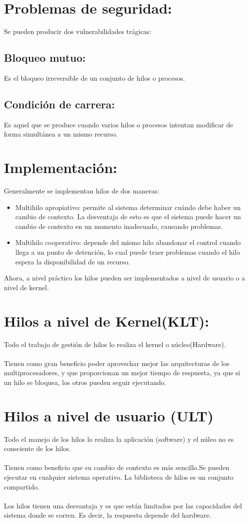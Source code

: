 \documentclass{report}   %
\begin{document}
\section*{Problemas de seguridad:}
Se pueden producir dos vulnerabilidades trágicas:
\subsection*{Bloqueo mutuo: }
 Es el bloqueo irreversible de un conjunto de hilos o procesos.
 \subsection*{Condición de carrera:}
  Es aquel que se produce cuando varios hilos o procesos intentan modificar de forma simultánea a un mismo recurso.\\
  
  \section*{Implementación:}
 Generalmente se implementan hilos de dos maneras:
\begin{itemize}
    \item Multihilo apropiativo: permite al sistema determinar cuándo debe haber un cambio de contexto. La desventaja de esto es que el sistema puede hacer un cambio de contexto en un momento inadecuado, causando problemas.
    \item Multihilo cooperativo: depende del mismo hilo abandonar el control cuando llega a un punto de detención, lo cual puede traer problemas cuando el hilo espera la disponibilidad de un recurso.
\end{itemize}

Ahora, a nivel práctico los hilos pueden ser implementados a nivel de usuario o a nivel de kernel. 

\section*{Hilos a nivel de Kernel(KLT):}
Todo el trabajo de gestión de hilos lo realiza el kernel o núcleo(Hardware).\\\\
Tienen como gran beneficio poder aprovechar mejor las arquitecturas de los
multiprocesadores, y que proporcionan un mejor tiempo de respuesta, ya que si un hilo se bloquea, los otros pueden seguir ejecutando.
\section*{Hilos a nivel de usuario (ULT)}
 Todo el manejo de los hilos lo realiza la aplicación (software) y el núleo no es consciente de los hilos.\\\\
Tienen como beneficio que su cambio de contexto es más sencillo.Se pueden ejecutar en cualquier sistema operativo. La biblioteca de hilos es un conjunto compartido.\\\\
Los hilos tienen  una desvantaja y es que están limitados por las capacidades del sistema donde se corren. Es decir, la respuesta depende del hardware.
\end{document}

